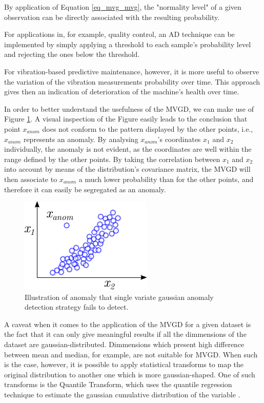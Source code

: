 \documentclass[conference]{IEEEtran}
\begin{document}
By application of Equation \ref{eq_mvg_mvg}, the "normality level" of a given observation can be directly associated with the resulting probability.

For applications in, for example, quality control, an AD technique can be implemented by simply applying a threshold to each sample's probability level and rejecting the ones below the threshold.

For vibration-based predictive maintenance, however, it is more useful to observe the variation of the vibration measurements probability over time. This approach gives then an indication of deterioration of the machine's health over time.

In order to better understand the usefulness of the MVGD, we can make use of Figure \ref{fig_mvg_singlecaseinnadequade}. A visual inspection of the Figure easily leads to the conclusion that point $x_{anom}$ does not conform to the pattern displayed by the other points, i.e., $x_{anom}$ represents an anomaly. By analysing $x_{anom}$'s coordinates $x_{1}$ and $x_{2}$ individually, the anomaly is not evident, as the coordinates are well within the range defined by the other points. By taking the correlation between $x_{1}$ and $x_{2}$ into account by means of the distribution's covariance matrix, the MVGD will then associate to $x_{anom}$ a much lower probability than for the other points, and therefore it can easily be segregated as an anomaly.

\begin{figure}[htbp]
\centerline{\includegraphics[width=0.5\columnwidth]{graphics/single_variab_innadequate.pdf}}
\caption{Illustration of anomaly that single variate gaussian anomaly detection strategy fails to detect.}
\label{fig_mvg_singlecaseinnadequade}
\end{figure}

A caveat when it comes to the application of the MVGD for a given dataset is the fact that it can only give meaningful results if all the dimmensions of the dataset are gaussian-distributed. Dimmensions which present high difference between mean and median, for example, are not suitable for MVGD. When such is the case, however, it is possible to apply statistical transforms to map the original distribution to another one which is more gaussian-shaped. One of such transforms is the Quantile Transform, which uses the quantile regression technique to estimate the gaussian cumulative distribution of the variable \cite{koenker2001quantile}.
\end{document}

